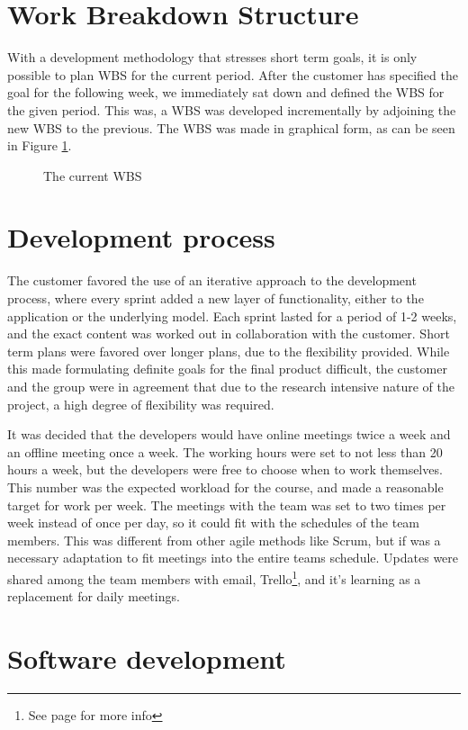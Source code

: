 \section{Work Breakdown Structure}
With a development methodology that stresses short term goals, it is only possible to plan WBS for the current period. After the customer has specified the goal for the following week, we immediately sat down and defined the WBS for the given period. This was, a WBS was developed incrementally by adjoining the new WBS to the previous. The WBS was made in graphical form, as can be seen in Figure \ref{fig:WBS}.
\begin{figure}[p]
\setlength\fboxsep{0pt}
\setlength\fboxrule{1pt}\noindent{}
\caption{The current WBS}
\label{fig:WBS}
\end{figure}
%
\section{Development process}
\label{def:devProcess}
The customer favored the use of an iterative approach to the development process, where every sprint added a new layer of functionality, either to the application or the underlying model. Each sprint lasted for a period of 1-2 weeks, and the exact content was worked out in collaboration with the customer. Short term plans were favored over longer plans, due to the flexibility provided. While this made formulating definite goals for the final product difficult, the customer and the group were in agreement that due to the research intensive nature of the project, a high degree of flexibility was required. 

It was decided that the developers would have online meetings twice a week and an offline meeting once a week. 
The working hours were set to not less than 20 hours a week, but the developers were free to choose when to work themselves. This number was the expected workload for the course, and made a reasonable target for work per week. The meetings with the team was set to two times per week instead of once per day, so it could fit with the schedules of the team members. This was different from other agile methods like Scrum, but if was a necessary adaptation to fit meetings into the entire teams schedule. Updates were shared among the team members with email, Trello\footnote{See page \pageref{def:trello} for more info}, and it's learning as a replacement for daily meetings.
%
\section{Software development}
